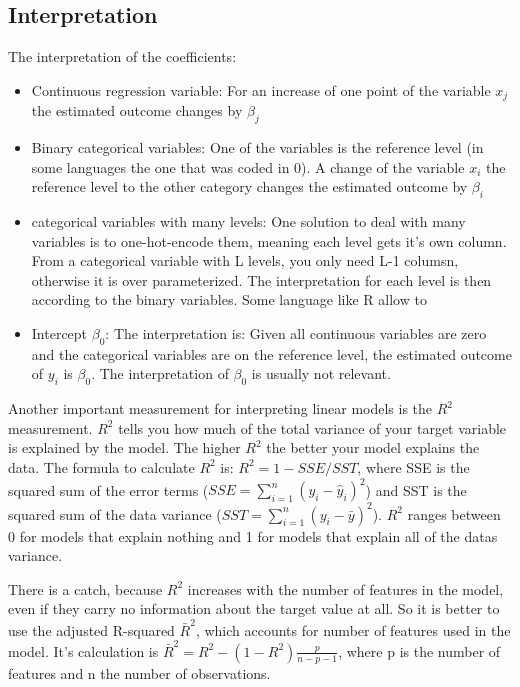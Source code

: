 \documentclass[12pt,]{krantz}
\providecommand{\tightlist}{%
  \setlength{\itemsep}{0pt}\setlength{\parskip}{0pt}}
\theoremstyle{definition}
\theoremstyle{definition}
\theoremstyle{definition}
\theoremstyle{remark}
\begin{document}
\subsection{Interpretation}\label{interpretation}

The interpretation of the coefficients:

\begin{itemize}
\tightlist
\item
  Continuous regression variable: For an increase of one point of the
  variable \(x_{j}\) the estimated outcome changes by \(\beta_{j}\)
\item
  Binary categorical variables: One of the variables is the reference
  level (in some languages the one that was coded in 0). A change of the
  variable \(x_{i}\) the reference level to the other category changes
  the estimated outcome by \(\beta_{i}\)
\item
  categorical variables with many levels: One solution to deal with many
  variables is to one-hot-encode them, meaning each level gets it's own
  column. From a categorical variable with L levels, you only need L-1
  columsn, otherwise it is over parameterized. The interpretation for
  each level is then according to the binary variables. Some language
  like R allow to
\item
  Intercept \(\beta_{0}\): The interpretation is: Given all continuous
  variables are zero and the categorical variables are on the reference
  level, the estimated outcome of \(y_{i}\) is \(\beta_{0}\). The
  interpretation of \(\beta_{0}\) is usually not relevant.
\end{itemize}

Another important measurement for interpreting linear models is the
\(R^2\) measurement. \(R^2\) tells you how much of the total variance of
your target variable is explained by the model. The higher \(R^2\) the
better your model explains the data. The formula to calculate \(R^2\)
is: \(R^2 = 1 - SSE/SST\), where SSE is the squared sum of the error
terms (\(SSE = \sum_{i=1}^n (y_i - \hat{y}_i)^2\)) and SST is the
squared sum of the data variance
(\(SST = \sum_{i=1}^n (y_i - \bar{y})^2\)). \(R^2\) ranges between 0 for
models that explain nothing and 1 for models that explain all of the
datas variance.

There is a catch, because \(R^2\) increases with the number of features
in the model, even if they carry no information about the target value
at all. So it is better to use the adjusted R-squared \(\bar{R}^2\),
which accounts for number of features used in the model. It's
calculation is \(\bar{R}^2 = R^2 - (1-R^2)\frac{p}{n - p - 1}\), where p
is the number of features and n the number of observations.
\end{document}
